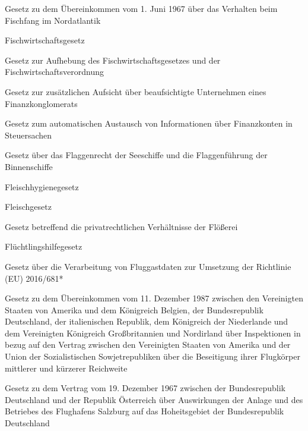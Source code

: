 \item[{FischNATÜbkG}] Gesetz zu dem Übereinkommen vom 1. Juni 1967 über das Verhalten beim Fischfang im Nordatlantik

\item[{FischWiG}] Fischwirtschaftsgesetz

\item[{FischWiVorschrAufhG}] Gesetz zur Aufhebung des Fischwirtschaftsgesetzes und der Fischwirtschaftsverordnung

\item[{FKAG}] Gesetz zur zusätzlichen Aufsicht über beaufsichtigte Unternehmen eines Finanzkonglomerats

\item[{FKAustG}] Gesetz zum automatischen Austausch von Informationen über Finanzkonten in Steuersachen

\item[{FlaggRG}] Gesetz über das Flaggenrecht der Seeschiffe und die Flaggenführung der Binnenschiffe

\item[{FlBG}] Fleischhygienegesetz

\item[{FlG}] Fleischgesetz

\item[{FlößereiG}] Gesetz betreffend die privatrechtlichen Verhältnisse der Flößerei

\item[{FlüHG}] Flüchtlingshilfegesetz

\item[{FlugDaG}] Gesetz über die Verarbeitung von Fluggastdaten zur Umsetzung der Richtlinie (EU) 2016/681*

\item[{FlugkmkRBÜbkG}] Gesetz zu dem Übereinkommen vom 11. Dezember 1987 zwischen den Vereinigten Staaten von Amerika und dem Königreich Belgien, der Bundesrepublik Deutschland, der italienischen Republik, dem Königreich der Niederlande und dem Vereinigten Königreich Großbritannien und Nordirland über Inspektionen in bezug auf den Vertrag zwischen den Vereinigten Staaten von Amerika und der Union der Sozialistischen Sowjetrepubliken über die Beseitigung ihrer Flugkörper mittlerer und kürzerer Reichweite

\item[{FluHfSalzbVtrAUTG}] Gesetz zu dem Vertrag vom 19. Dezember 1967 zwischen der Bundesrepublik Deutschland und der Republik Österreich über Auswirkungen der Anlage und des Betriebes des Flughafens Salzburg auf das Hoheitsgebiet der Bundesrepublik Deutschland


